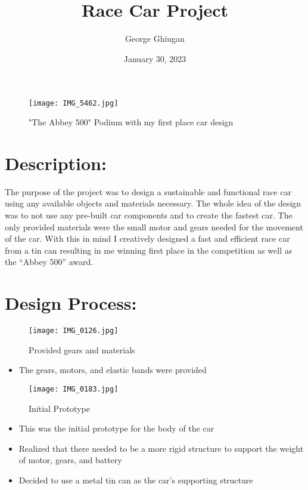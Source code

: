 \documentclass[12pt]{article}
\title{ \\ \Large \textbf{Race Car Project}}
\author{George Ghiugan}
\date{January 30, 2023}
\begin{document}
\maketitle

\begin{figure}[H]
    \centering
    \texttt{[image: IMG\_5462.jpg]}
    \caption{"The Abbey 500" Podium with my first place car design}
    \label{fig:enter-label}
\end{figure}

\section*{Description:}

The purpose of the project was to design a sustainable and functional race car using any available objects and materials necessary. The whole idea of the design was to not use any pre-built car components and to create the fastest car. The only provided materials were the small motor and gears needed for the movement of the car. With this in mind I creatively designed a fast and efficient race car from a tin can resulting in me winning first place in the competition as well as the “Abbey 500” award.

\section*{ Design Process:}

\begin{figure}[H]
    \centering
    \texttt{[image: IMG\_0126.jpg]}
    \caption{Provided gears and materials}
    \label{fig:enter-label}
\end{figure}

\begin{itemize}
    \item The gears, motors, and elastic bands were provided
  \end{itemize}

\begin{figure}[H]
    \centering
    \texttt{[image: IMG\_0183.jpg]}
    \caption{Initial Prototype}
    \label{fig:enter-label}
\end{figure}



\begin{itemize}
    \item This was the initial prototype for the body of the car
    \item Realized that there needed to be a more rigid structure to support the weight of motor, gears, and battery
    \item Decided to use a metal tin can as the car's supporting structure
  \end{itemize}
\end{document}
